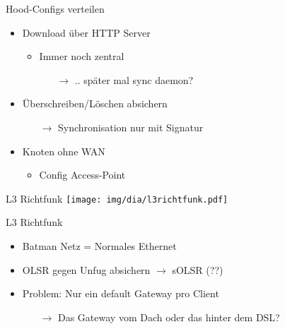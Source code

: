 \begin{frame}{Hood-Configs verteilen}
    \begin{itemize}
        \item Download über HTTP Server
            \begin{itemize}
                \item Immer noch zentral
                \begin{itemize}
                    \item[$\rightarrow$] .. später mal sync daemon?
                \end{itemize}
            \end{itemize}
        \item Überschreiben/Löschen absichern
        \begin{itemize}
            \item[$\rightarrow$] Synchronisation nur mit Signatur
        \end{itemize}
        \item Knoten ohne WAN
        \begin{itemize}
            \item Config Access-Point
        \end{itemize}
    \end{itemize}
\end{frame}

\begin{frame}{L3 Richtfunk}
    \center
    \texttt{[image: img/dia/l3richtfunk.pdf]}
\end{frame}

\begin{frame}{L3 Richtfunk}
    \begin{itemize}
        \item Batman Netz = Normales Ethernet
        \item OLSR gegen Unfug absichern $\rightarrow$ sOLSR (??)
        \item Problem: Nur ein default Gateway pro Client
        \begin{itemize}
            \item[$\rightarrow$] Das Gateway vom Dach oder das hinter dem DSL?
        \end{itemize}
    \end{itemize}
\end{frame}
